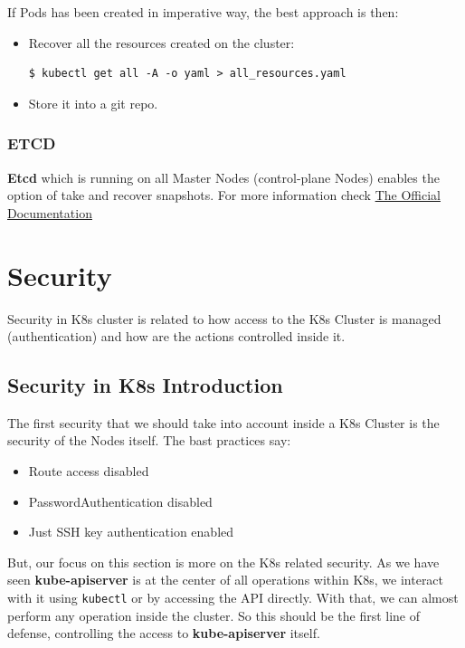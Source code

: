 \documentclass{article}
\newenvironment{blocktemplateII}[1]{%
    \tcolorbox[beamer,%
    noparskip,breakable,
    colframe=Green,%
    colbacklower=LimeGreen!75!LightGreen,%
    title=#1]}%
    {\endtcolorbox}
\newenvironment{codetemplate}[1][]{%
  \mybasecolorbox[#1]
  \itshape
}{%
  \endmybasecolorbox
}
\begin{document}
\begin{blocktemplateII}{NOTE}
If Pods has been created in imperative way, the best approach is then:
\begin{itemize}
    \item Recover all the resources created on the cluster:
\begin{codetemplate}{}
\begin{verbatim}
$ kubectl get all -A -o yaml > all_resources.yaml
\end{verbatim}
\end{codetemplate}

    \item Store it into a git repo.
\end{itemize}
\end{blocktemplateII}

\subsubsection{ETCD}
\textbf{Etcd} which is running on all Master Nodes (control-plane Nodes) enables the option of take and recover snapshots. For more information check \href{https://kubernetes.io/docs/tasks/administer-cluster/configure-upgrade-etcd/}{The Official Documentation}

\newpage
\section{Security}

Security in K8s cluster is related to how access to the K8s Cluster is managed (authentication) and how are the actions controlled inside it.


\subsection{Security in K8s Introduction}
The first security that we should take into account inside a K8s Cluster is the security of the Nodes itself. The bast practices say:
\begin{itemize}
    \item Route access disabled
    \item PasswordAuthentication disabled
    \item Just SSH key authentication enabled
\end{itemize}

But, our focus on this section is more on the K8s related security. As we have seen \textbf{kube-apiserver} is at the center
of all operations within K8s, we interact with it using \verb|kubectl| or by accessing the API directly. With that, we can almost perform any operation inside the cluster. So this should be the first line of defense, controlling the access to \textbf{kube-apiserver} itself.
\end{document}
